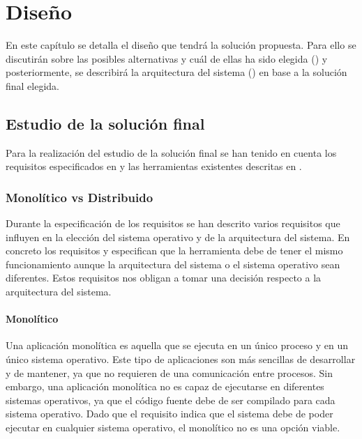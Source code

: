 \chapter{Diseño}\label{chap:diseno}

En este capítulo se detalla el diseño que tendrá la solución propuesta. Para ello se discutirán sobre las posibles alternativas y cuál de ellas ha sido elegida () y posteriormente, se describirá la arquitectura del sistema () en base a la solución final elegida.

\section{Estudio de la solución final}\label{sec:estudio-solucion-final}

Para la realización del estudio de la solución final se han tenido en cuenta los requisitos especificados en  y las herramientas existentes descritas en . 

\subsection{Monolítico vs Distribuido} \label{sec:monolitico-vs-distribuido}

Durante la especificación de los requisitos se han descrito varios requisitos que influyen en la elección del sistema operativo y de la arquitectura del sistema. En concreto los requisitos  y  especifican que la herramienta debe de tener el mismo funcionamiento aunque la arquitectura del sistema o el sistema operativo sean diferentes. Estos requisitos nos obligan a tomar una decisión respecto a la arquitectura del sistema. 

\subsubsection{Monolítico} \label{sec:monolitico}

Una aplicación monolítica es aquella que se ejecuta en un único proceso y en un único sistema operativo. Este tipo de aplicaciones son más sencillas de desarrollar y de mantener, ya que no requieren de una comunicación entre procesos. Sin embargo, una aplicación monolítica no es capaz de ejecutarse en diferentes sistemas operativos, ya que el código fuente debe de ser compilado para cada sistema operativo. Dado que el requisito  indica que el sistema debe de poder ejecutar en cualquier sistema operativo, el monolítico no es una opción viable.

